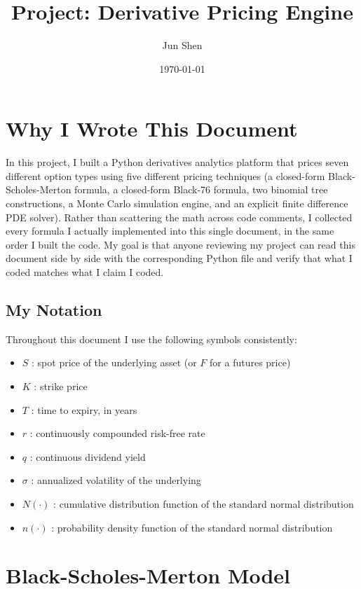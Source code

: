 \documentclass[12pt,a4paper]{article}
\title{\textbf{Project: Derivative Pricing Engine}}
\author{Jun Shen}
\date{\today}
\begin{document}
\maketitle
\tableofcontents
\newpage

\section{Why I Wrote This Document}

In this project, I built a Python derivatives analytics platform that prices
seven different option types using five different pricing techniques
(a closed-form Black-Scholes-Merton formula, a closed-form Black-76 formula,
two binomial tree constructions, a Monte Carlo simulation engine, and an
explicit finite difference PDE solver). Rather than scattering the math
across code comments, I collected every formula I actually implemented into
this single document, in the same order I built the code. My goal is that
anyone reviewing my project can read this document side by side with the
corresponding Python file and verify that what I coded matches what I
claim I coded.

\subsection{My Notation}

Throughout this document I use the following symbols consistently:

\begin{itemize}[noitemsep]
    \item $S$ : spot price of the underlying asset (or $F$ for a futures price)
    \item $K$ : strike price
    \item $T$ : time to expiry, in years
    \item $r$ : continuously compounded risk-free rate
    \item $q$ : continuous dividend yield
    \item $\sigma$ : annualized volatility of the underlying
    \item $N(\cdot)$ : cumulative distribution function of the standard normal distribution
    \item $n(\cdot)$ : probability density function of the standard normal distribution
\end{itemize}

\section{Black-Scholes-Merton Model}
\end{document}
